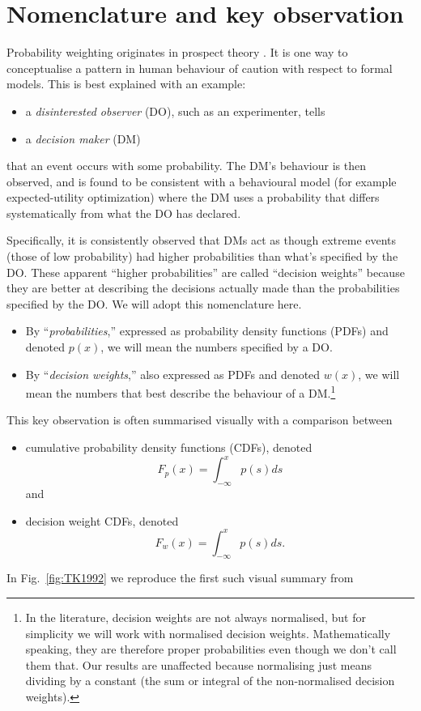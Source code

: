 \documentclass[11pt]{article}
\newcommand{\fref}[1]{Fig.~\ref{fig:#1}}
\newcommand{\be}{\begin{equation}}
\newcommand{\ee}{\end{equation}}
\newcommand{\bi}{\begin{itemize}}
\newcommand{\ei}{\end{itemize}}
\numberwithin{equation}{section}
\begin{document}
\section{Nomenclature and key observation}
Probability weighting originates in prospect theory \citep{Barberis2013}. It is one way to conceptualise a pattern in human behaviour of caution with respect to formal models. This is best explained with an example:
\bi
\item 
a {\it disinterested observer} (DO), such as an experimenter, tells
\item
a {\it decision maker} (DM) 
\ei
that an event occurs with some probability. The DM's behaviour is then observed, and is found to be consistent with a behavioural model (for example expected-utility optimization) where the DM uses a probability that differs systematically from what the DO has declared. 

Specifically, it is consistently observed that DMs act as though extreme events (those of low probability) had higher probabilities than what's specified by the DO. These apparent ``higher probabilities'' are called ``decision weights'' because they are better at describing the decisions actually made than the probabilities specified by the DO. We will adopt this nomenclature here. 
\bi
\item
By ``{\it probabilities},'' expressed as probability density functions (PDFs) and denoted $p(x)$, we will mean the numbers specified by a DO.
\item
By ``{\it decision weights},'' also expressed as PDFs and denoted $w(x)$, we will mean the numbers that best describe the behaviour of a DM.\footnote{In the literature, decision weights are not always normalised, but for simplicity we will work with normalised decision weights. Mathematically speaking, they are therefore proper probabilities even though we don't call them that. Our results are unaffected because normalising just means dividing by a constant (the sum or integral of the non-normalised decision weights).}
\ei

This key observation is often summarised visually with a comparison between 
\bi
\item
cumulative probability density functions (CDFs), denoted 
\be
F_p(x)=\int_{-\infty}^x p(s) ds
\ee
 and 
\item
decision weight CDFs, denoted
\be
F_w(x)=\int_{-\infty}^x p(s) ds.
\ee
\ei
In \fref{TK1992} we reproduce the first such visual summary from \citet{TverskyKahneman1992}
\end{document}

